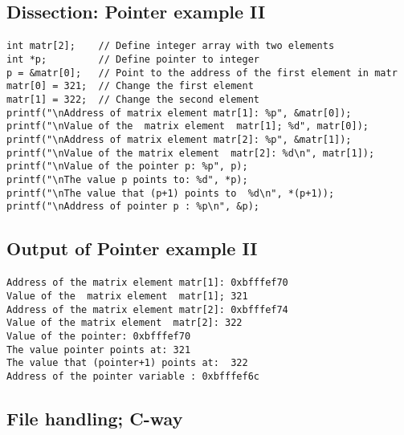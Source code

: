 \documentclass[%
oneside,                 %
final,                   %
10pt]{article}
\begin{document}
\subsection*{Dissection: Pointer example II}


\paragraph{}
\begin{verbatim}
int matr[2];    // Define integer array with two elements
int *p;         // Define pointer to integer
p = &matr[0];   // Point to the address of the first element in matr
matr[0] = 321;  // Change the first element
matr[1] = 322;  // Change the second element
printf("\nAddress of matrix element matr[1]: %p", &matr[0]);
printf("\nValue of the  matrix element  matr[1]; %d", matr[0]);
printf("\nAddress of matrix element matr[2]: %p", &matr[1]);
printf("\nValue of the matrix element  matr[2]: %d\n", matr[1]);
printf("\nValue of the pointer p: %p", p);
printf("\nThe value p points to: %d", *p);
printf("\nThe value that (p+1) points to  %d\n", *(p+1));
printf("\nAddress of pointer p : %p\n", &p);
\end{verbatim}




\subsection*{Output of Pointer example II}


\paragraph{}
\begin{Verbatim}[numbers=none,fontsize=\fontsize{9pt}{9pt},baselinestretch=0.95]
Address of the matrix element matr[1]: 0xbfffef70
Value of the  matrix element  matr[1]; 321
Address of the matrix element matr[2]: 0xbfffef74
Value of the matrix element  matr[2]: 322
Value of the pointer: 0xbfffef70
The value pointer points at: 321
The value that (pointer+1) points at:  322
Address of the pointer variable : 0xbfffef6c
\end{Verbatim}



\subsection*{File handling; C-way}
\end{document}
